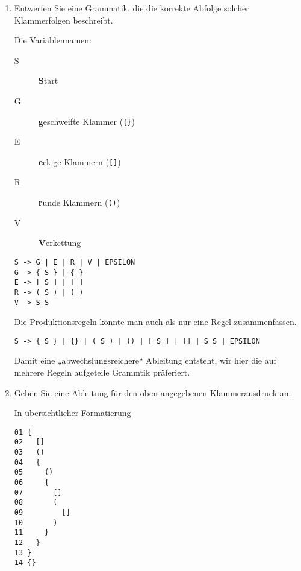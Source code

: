 \documentclass{lehramt-informatik-aufgabe}
\begin{document}
\begin{enumerate}


\item Entwerfen Sie eine Grammatik, die die korrekte Abfolge solcher
Klammerfolgen beschreibt.

\begin{liAntwort}
Die Variablennamen:

\begin{description}
\item[S] \textbf{S}tart

\item[G] \textbf{g}eschweifte Klammer (\texttt{\{\}})

\item[E] \textbf{e}ckige Klammern (\texttt{[]})

\item[R] \textbf{r}unde Klammern (\texttt{()})

\item[V] \textbf{V}erkettung
\end{description}

\begin{verbatim}
S -> G | E | R | V | EPSILON
G -> { S } | { }
E -> [ S ] | [ ]
R -> ( S ) | ( )
V -> S S
\end{verbatim}

Die Produktionsregeln könnte man auch als nur eine Regel zusammenfassen.

\begin{verbatim}
S -> { S } | {} | ( S ) | () | [ S ] | [] | S S | EPSILON
\end{verbatim}

Damit eine „abwechslungsreichere“ Ableitung entsteht, wir hier die auf
mehrere Regeln aufgeteile Grammtik präferiert.

\end{liAntwort}

\newpage

\item Geben Sie eine Ableitung für den oben angegebenen Klammerausdruck
an.

\begin{liAntwort}
In übersichtlicher Formatierung

\begin{verbatim}
01 {
02   []
03   ()
04   {
05     ()
06     {
07       []
08       (
09         []
10       )
11     }
12   }
13 }
14 {}
\end{verbatim}


\end{liAntwort}
\end{enumerate}
\end{document}
